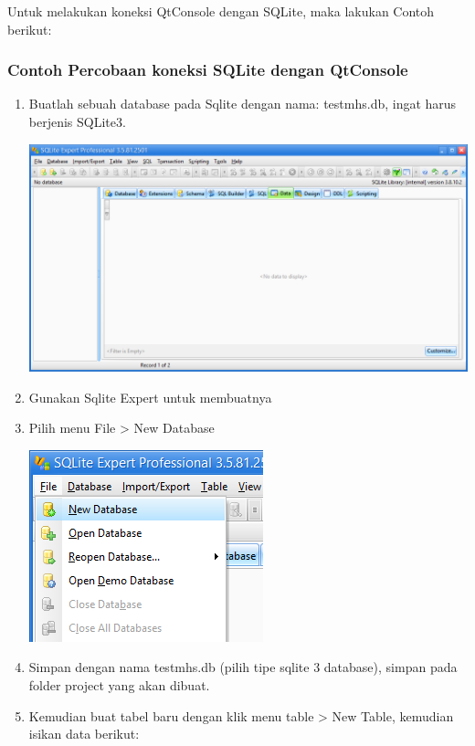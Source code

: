 Untuk melakukan koneksi QtConsole dengan SQLite, maka lakukan Contoh
berikut:

\subsubsection*{Contoh Percobaan koneksi SQLite dengan QtConsole}

\begin{enumerate}


\item
  Buatlah sebuah database pada Sqlite dengan nama: testmhs.db, ingat
  harus berjenis SQLite3.

\includegraphics[width=0.7\linewidth]{images/sqlite-expert}
  
  
\item
  Gunakan Sqlite Expert untuk membuatnya
\item
  Pilih menu File \textgreater{} New Database
  
  \includegraphics[width=0.7\linewidth]{images/file-new-database}
  
\item
  Simpan dengan nama testmhs.db (pilih tipe sqlite 3 database), simpan
  pada folder project yang akan dibuat.
\item
  Kemudian buat tabel baru dengan klik menu table \textgreater{} New Table,
  kemudian isikan data berikut:


\end{enumerate}
